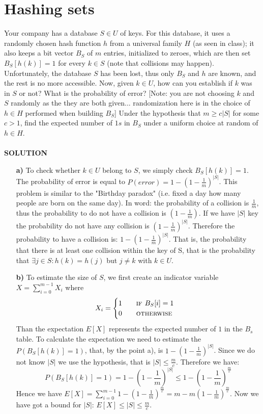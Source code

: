 \documentclass[a4paper]{article}
\begin{document}
\section*{Hashing sets}
Your company has a database $S \in U$ of keys. For this database, it uses a randomly chosen hash function $h$ from a universal family $H$ (as seen in class); it also keeps a bit vector $B_S$ of $m$ entries, initialized to zeroes, which are then set $B_S[h(k)] = 1$ for every $k \in S$ (note that collisions may happen). Unfortunately, the database $S$ has been lost, thus only $B_S$ and $h$ are known, and the rest is no more accessible. Now, given $k \in U$, how can you establish if $k$ was in $S$ or not? What is the probability of error? [Note: you are not choosing $k$ and $S$ randomly as the they are
both given... randomization here is in the choice of $h \in H$ performed when building $B_S$] Under the hypothesis that $m \geq c |S|$ for some $c > 1$, find the expected number of $1s$ in $B_S$ under a uniform choice at random of $h \in H$.
\\ 
\\
\textbf{SOLUTION}
\\

\begin{itemize}
\item[\textbf{a)}] To check whether $k\in U$ belong to $S$, we simply check $B_S[h(k)]=1$. The probability of error is equal to $P(error)=1-(1 - \frac{1}{m})^{|S|}$. This problem is similar to the "Birthday paradox" (i.e. fixed a day how many people are born on the same day). In word: the probability of a collision is $\frac{1}{m}$, thus the probability to do not have a collision is $(1-\frac{1}{m})$. If we have $|S|$ key the probability do not have any collision is $(1 - \frac{1}{m})^{|S|}$. Therefore the probability to have a collision is: $1-(1 - \frac{1}{m})^{|S|}$. That is, the probability that there is at least one collision within the key of S, that is the probability that $\exists j\in S : h(k)=h(j)$ but $j\neq k$ with $k \in U$.
\item[\textbf{b)}] To estimate the size of $S$, we first create an indicator variable $X=\sum_{i=0}^{m-1}X_i$ where
\begin{equation}
X_{i} =  
\begin{cases} 
1 \qquad \textsc{if }B_S[i]=1\\
0 \qquad \textsc{otherwise}
\end{cases}
\nonumber
\end{equation}
Than the expectation $E[X]$ represents the expected number of $1$ in the $B_s$ table. To calculate the expectation we need to estimate the $P(B_S[h(k)]=1)$, that, by the point a), is $1-(1 - \frac{1}{m})^{|S|}$. Since we do not know $|S|$ we use the hypothesis, that is $|S|\leq \frac{m}{c}$. Therefore we have:
\begin{equation}
P(B_S[h(k)]=1)=1-(1 - \frac{1}{m})^{|S|} \leq 1-(1 - \frac{1}{m})^{\frac{m}{c}}
\nonumber
\end{equation}
Hence we have $E[X]= \sum_{i=0}^{m-1} 1-(1 - \frac{1}{m})^{\frac{m}{c}}=m-m(1 - \frac{1}{m})^{\frac{m}{c}}$. Now we have got a bound for $|S|$: $E[X]\leq|S|\leq \frac{m}{c}$.
\end{itemize}
\end{document}
